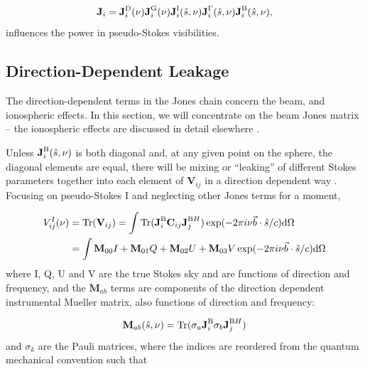 \begin{equation}
\textbf{J}_i = \textbf{J}_i^{\rm D}(\nu) \textbf{J}_i^{\rm G}(\nu)  \textbf{J}_i^{\rm I}(\hat{s},\nu) \textbf{J}_i^{\rm \Gamma}(\hat{s},\nu)  \textbf{J}_i^{\rm B}(\hat{s},\nu) ,
\end{equation}
influences the power in pseudo-Stokes visibilities.

\subsection{Direction-Dependent Leakage}

The direction-dependent terms in the Jones chain concern the beam, and ionospheric effects. In this section, we will concentrate on the beam Jones matrix -- the ionospheric effects are discussed in detail elsewhere \citep[e.g.][{\color{red} Martinot et al. (in prep.)}]{Intema.09,Vedantham.15,Vedantham.16}.

Unless $\textbf{J}_i^{\rm B}(\hat{s},\nu)$ is both diagonal and, at any given point on the sphere, the diagonal elements are equal, there will be mixing or ``leaking'' of different Stokes parameters together into each element of $\textbf{V}_{ij}$ in a direction dependent way \citep[e.g.][]{Geil.11, Smirnov.11, Smirnov.11.2, Nunhokee.17}. Focusing on pseudo-Stokes I and neglecting other Jones terms for a moment,

\begin{equation}
\begin{split}
V^I_{ij}(\nu) &= {\rm Tr}(\textbf{V}_{ij}) = \int {\rm Tr}(\textbf{J}_i^{\rm B}\textbf{C}_{ij}\textbf{J}_j^{{\rm B}H}) \exp(-2\pi i \nu \vec{b}\cdot\hat{s}/c) {\rm d}\Omega \\
					  &= \int \textbf{M}_{00}I + \textbf{M}_{01}Q + \textbf{M}_{02}U + \textbf{M}_{03}V \exp(-2\pi i \nu \vec{b}\cdot\hat{s}/c) {\rm d}\Omega
\end{split}
\label{eq:interferometry_pseudo-stokes-I-leakage}
\end{equation}
where I, Q, U and V are the true Stokes sky and are functions of direction and frequency, and the $\textbf{M}_{ab}$ terms are components of the direction dependent instrumental Mueller matrix, also functions of direction and frequency:

\begin{equation}
\textbf{M}_{ab}(\hat{s},\nu) = {\rm Tr} ( \sigma_a \textbf{J}_i^{\rm B} \sigma_b \textbf{J}_j^{{\rm B}H})
\label{eq:interferometry_mueller-terms}
\end{equation}
and $\sigma_k$ are the Pauli matrices, where the indices are reordered from the quantum mechanical convention such that 

